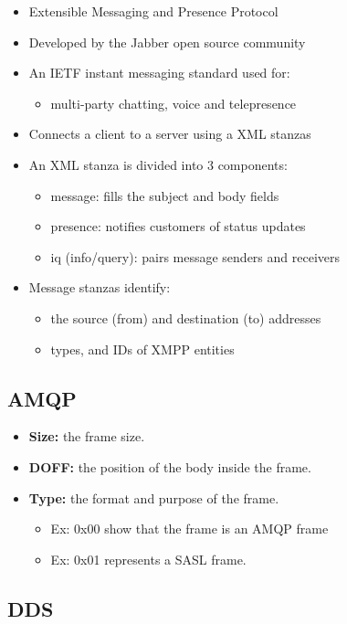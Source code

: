\begin{itemize}
	\item Extensible Messaging and Presence Protocol
	\item Developed by the Jabber open source community
	\item An IETF instant messaging standard used for:
	\begin{itemize}
		\item multi-party chatting, voice and telepresence
	\end{itemize}
	\item Connects a client to a server using a XML stanzas
	\item An XML stanza is divided into 3 components:
	\begin{itemize}
		\item message: fills the subject and body fields
		\item presence: notifies customers of status updates
		\item iq (info/query): pairs message senders and receivers
	\end{itemize}
	\item Message stanzas identify:
	\begin{itemize}
		\item the source (from) and destination (to) addresses
		\item types, and IDs of XMPP entities
	\end{itemize}
\end{itemize}

\subsection{AMQP}

\begin{itemize}
	\item \textbf{Size:} the frame size.
	\item \textbf{DOFF:} the position of the body inside the frame.
	\item \textbf{Type:} the format and purpose of the frame.
	\begin{itemize}
		\item Ex: 0x00 show that the frame is an AMQP frame
		\item Ex: 0x01 represents a SASL frame.
	\end{itemize}
\end{itemize}

\subsection{DDS}

